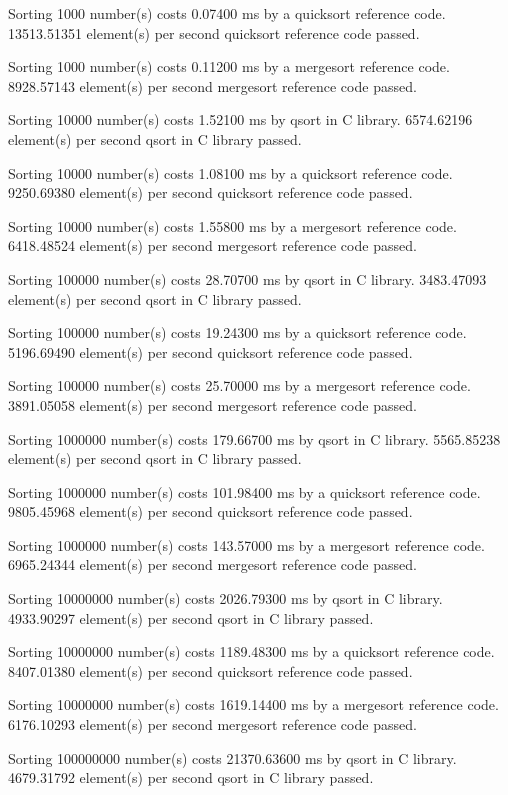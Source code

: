 \documentclass[12pt]{article}
\begin{document}
Sorting 1000 number(s) costs 0.07400 ms by a quicksort reference code. 13513.51351 element(s) per second
quicksort reference code passed.

Sorting 1000 number(s) costs 0.11200 ms by a mergesort reference code. 8928.57143 element(s) per second
mergesort reference code passed.

Sorting 10000 number(s) costs 1.52100 ms by qsort in C library. 6574.62196 element(s) per second
qsort in C library passed.

Sorting 10000 number(s) costs 1.08100 ms by a quicksort reference code. 9250.69380 element(s) per second
quicksort reference code passed.

Sorting 10000 number(s) costs 1.55800 ms by a mergesort reference code. 6418.48524 element(s) per second
mergesort reference code passed.

Sorting 100000 number(s) costs 28.70700 ms by qsort in C library. 3483.47093 element(s) per second
qsort in C library passed.

Sorting 100000 number(s) costs 19.24300 ms by a quicksort reference code. 5196.69490 element(s) per second
quicksort reference code passed.

Sorting 100000 number(s) costs 25.70000 ms by a mergesort reference code. 3891.05058 element(s) per second
mergesort reference code passed.

Sorting 1000000 number(s) costs 179.66700 ms by qsort in C library. 5565.85238 element(s) per second
qsort in C library passed.

Sorting 1000000 number(s) costs 101.98400 ms by a quicksort reference code. 9805.45968 element(s) per second
quicksort reference code passed.

Sorting 1000000 number(s) costs 143.57000 ms by a mergesort reference code. 6965.24344 element(s) per second
mergesort reference code passed.

Sorting 10000000 number(s) costs 2026.79300 ms by qsort in C library. 4933.90297 element(s) per second
qsort in C library passed.

Sorting 10000000 number(s) costs 1189.48300 ms by a quicksort reference code. 8407.01380 element(s) per second
quicksort reference code passed.

Sorting 10000000 number(s) costs 1619.14400 ms by a mergesort reference code. 6176.10293 element(s) per second
mergesort reference code passed.

Sorting 100000000 number(s) costs 21370.63600 ms by qsort in C library. 4679.31792 element(s) per second
qsort in C library passed.
\end{document}
